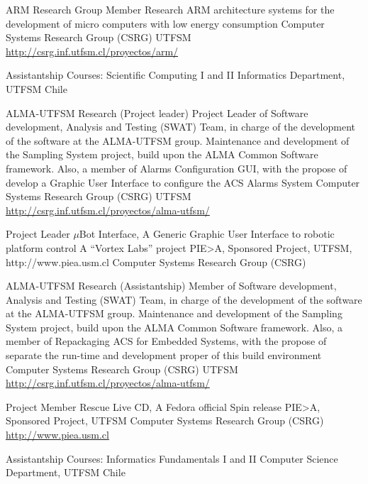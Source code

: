 \documentclass[11pt,a4paper]{moderncv}
\begin{document}
        {ARM Research Group Member}
        {Research ARM architecture systems for the development of micro computers
         with low energy consumption}
        {Computer Systems Research Group (CSRG)}
        {UTFSM}
        {\url{http://csrg.inf.utfsm.cl/proyectos/arm/}}

        {Assistantship}
        {Courses: Scientific Computing I and II}
        {Informatics Department, UTFSM}
        {Chile}{}

        {ALMA-UTFSM Research (Project leader)}
        {Project Leader of Software development, Analysis and Testing (SWAT) Team, in charge of the development of the software at the ALMA-UTFSM group.
        Maintenance and development of the Sampling System project, build upon the ALMA Common Software framework.
        Also, a member of Alarms Configuration GUI, with the propose of develop a Graphic User Interface to configure the ACS Alarms System}
        {Computer Systems Research Group (CSRG)}
        {UTFSM}
        {\url{http://csrg.inf.utfsm.cl/proyectos/alma-utfsm/}}

        {Project Leader}
        {$\mu$Bot Interface, A Generic Graphic User Interface to robotic platform control}
        {A ``Vortex Labs'' project}
        {PIE>A, Sponsored Project, UTFSM, http://www.piea.usm.cl}
        {Computer Systems Research Group (CSRG)}

        {ALMA-UTFSM Research (Assistantship)}
        {Member of Software development, Analysis and Testing (SWAT) Team, in charge of the development of the software at the ALMA-UTFSM group.
        Maintenance and development of the Sampling System project, build upon the ALMA Common Software framework.
        Also, a member of Repackaging ACS for Embedded Systems, with the propose of separate the run-time and development
        proper of this build environment}
        {Computer Systems Research Group (CSRG)}
        {UTFSM}
        {\url{http://csrg.inf.utfsm.cl/proyectos/alma-utfsm/}}

        {Project Member}
        {Rescue Live CD, A Fedora official Spin release}
        {PIE>A, Sponsored Project, UTFSM}
        {Computer Systems Research Group (CSRG)}
        {\url{http://www.piea.usm.cl}}

        {Assistantship}
        {Courses: Informatics Fundamentals  I and II}
        {Computer Science Department, UTFSM}
        {Chile}{}
\end{document}
